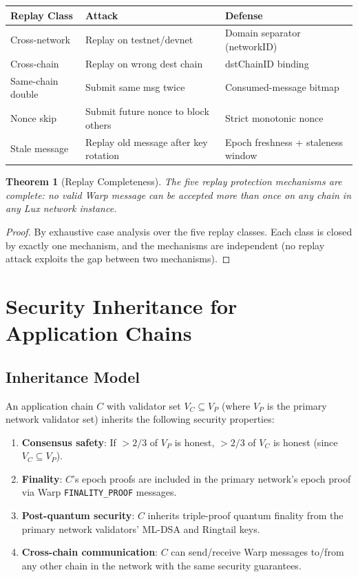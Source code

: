 \documentclass[11pt,a4paper]{article}
\newtheorem{theorem}{Theorem}[section]
\begin{document}
\begin{center}
\begin{tabular}{lll}
\toprule
\textbf{Replay Class} & \textbf{Attack} & \textbf{Defense} \\
\midrule
Cross-network & Replay on testnet/devnet & Domain separator (networkID) \\
Cross-chain & Replay on wrong dest chain & dstChainID binding \\
Same-chain double & Submit same msg twice & Consumed-message bitmap \\
Nonce skip & Submit future nonce to block others & Strict monotonic nonce \\
Stale message & Replay old message after key rotation & Epoch freshness + staleness window \\
\bottomrule
\end{tabular}
\end{center}

\begin{theorem}[Replay Completeness]
The five replay protection mechanisms are complete: no valid Warp message can be accepted more than once on any chain in any Lux network instance.
\end{theorem}

\begin{proof}
By exhaustive case analysis over the five replay classes. Each class is closed by exactly one mechanism, and the mechanisms are independent (no replay attack exploits the gap between two mechanisms).
\end{proof}

\section{Security Inheritance for Application Chains}

\subsection{Inheritance Model}

An application chain $C$ with validator set $V_C \subseteq V_P$ (where $V_P$ is the primary network validator set) inherits the following security properties:

\begin{enumerate}[leftmargin=2em]
\item \textbf{Consensus safety}: If $>2/3$ of $V_P$ is honest, $>2/3$ of $V_C$ is honest (since $V_C \subseteq V_P$).
\item \textbf{Finality}: $C$'s epoch proofs are included in the primary network's epoch proof via Warp \texttt{FINALITY\_PROOF} messages.
\item \textbf{Post-quantum security}: $C$ inherits triple-proof quantum finality from the primary network validators' ML-DSA and Ringtail keys.
\item \textbf{Cross-chain communication}: $C$ can send/receive Warp messages to/from any other chain in the network with the same security guarantees.
\end{enumerate}
\end{document}
